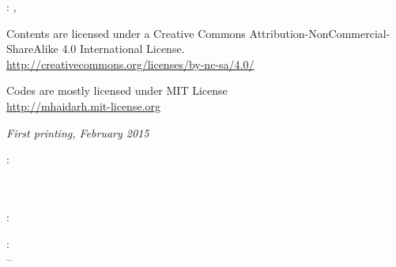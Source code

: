 

\thispagestyle{empty}

\hfill

\vfill

\noindent\myName: \textit{\myTitle,} %
\textcopyright\ \myTime

\bigskip

\noindent Contents are licensed under a Creative Commons Attribution-NonCommercial-ShareAlike 4.0 International License.\\
\url{http://creativecommons.org/licenses/by-nc-sa/4.0/}

\medskip

\noindent Codes are mostly licensed under MIT License\\
\url{http://mhaidarh.mit-license.org}

\bigskip

\noindent \textit{First printing, February 2015}

\bigskip

\noindent{}: \\
\mySupervisor \\
\myExaminerA \\
\myExaminerB

\medskip

\noindent{}: \\
\myLocation

\medskip

\noindent{}: \\
\myMonthFirst \xspace \myYearFirst \xspace -- \myMonthLast \xspace \myYearLast

